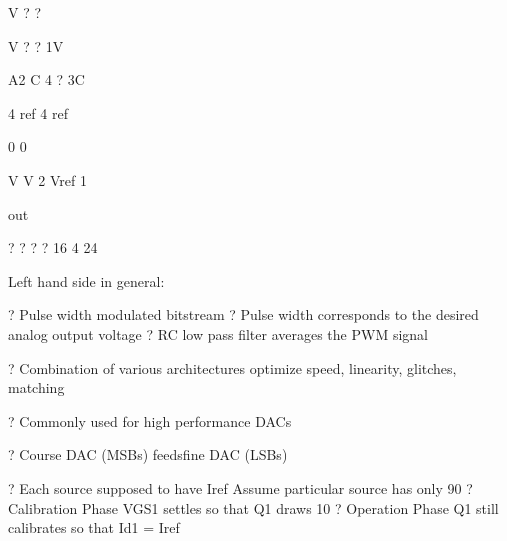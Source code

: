 \documentclass[2pt,landscape]{article}
\begin{document}
\begin{multicols*}{5}
V	? ?


V	? ? 1V



A2	C	4 ? 3C


4	ref	4	ref


0	0


V	V 2	Vref	1





out


? ?	?	?
16	4	24




Left hand side in general:





?	Pulse width modulated bitstream
?	Pulse width corresponds to the desired analog output voltage
?	RC low pass filter averages the PWM signal






?	Combination of various 
architectures
\textbullet 	optimize speed, linearity,
\textbullet 	glitches, matching


?	Commonly used for high 
performance DACs


?	Course DAC (MSBs) 
\textbullet  feeds\textbullet fine DAC (LSBs)



?	Each source supposed to have Iref
\textbullet 	Assume particular source has only 90%
?	Calibration Phase
\textbullet 	VGS1 settles so that Q1 draws 10%
?	Operation Phase
\textbullet 	Q1 still calibrates so that Id1 = Iref

	\end{multicols*}
\end{document}
